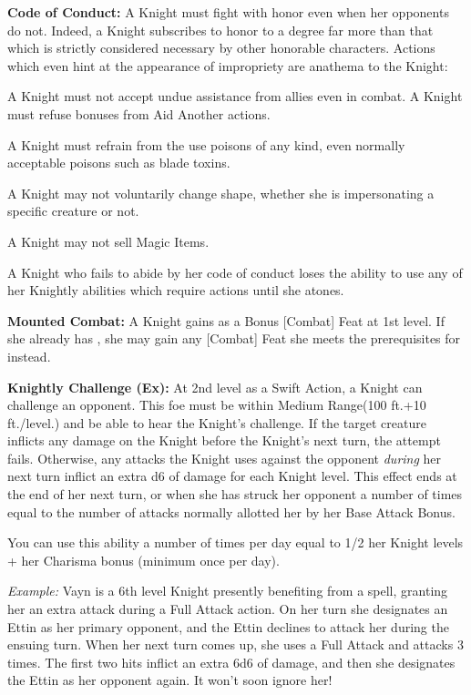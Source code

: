 \textbf{Code of Conduct:} A Knight must fight with honor even when her opponents do not. Indeed, a Knight subscribes to honor to a degree far more than that which is strictly considered necessary by other honorable characters. Actions which even hint at the appearance of impropriety are anathema to the Knight:

\begin{itemize*}
\item A Knight must not accept undue assistance from allies even in combat. A Knight must refuse bonuses from Aid Another actions.
\item A Knight must refrain from the use poisons of any kind, even normally acceptable poisons such as blade toxins.
\item A Knight may not voluntarily change shape, whether she is impersonating a specific creature or not.
\item A Knight may not sell Magic Items.
\end{itemize*}

A Knight who fails to abide by her code of conduct loses the ability to use any of her Knightly abilities which require actions until she atones.

\textbf{Mounted Combat:} A Knight gains  as a Bonus [Combat] Feat at 1st level. If she already has , she may gain any [Combat] Feat she meets the prerequisites for instead.

\textbf{Knightly Challenge (Ex):} At 2nd level as a Swift Action, a Knight can challenge an opponent. This foe must be within Medium Range(100 ft.+10 ft./level.) and be able to hear the Knight's challenge. If the target creature inflicts any damage on the Knight before the Knight's next turn, the attempt fails. Otherwise, any attacks the Knight uses against the opponent \textit{during} her next turn inflict an extra d6 of damage for each Knight level. This effect ends at the end of her next turn, or when she has struck her opponent a number of times equal to the number of attacks normally allotted her by her Base Attack Bonus.

You can use this ability a number of times per day equal to 1/2 her Knight levels + her Charisma bonus (minimum once per day).

\textit{Example:} Vayn is a 6th level Knight presently benefiting from a  spell, granting her an extra attack during a Full Attack action. On her turn she designates an Ettin as her primary opponent, and the Ettin declines to attack her during the ensuing turn. When her next turn comes up, she uses a Full Attack and attacks 3 times. The first two hits inflict an extra 6d6 of damage, and then she designates the Ettin as her opponent again. It won't soon ignore her!

